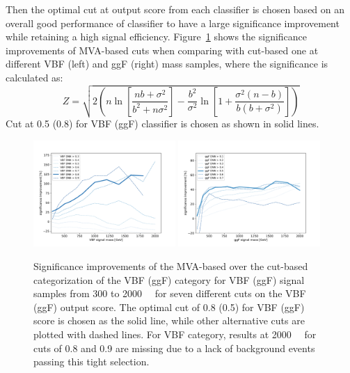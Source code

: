 Then the optimal cut at output score from each classifier is chosen based on an overall good performance of classifier to have a large significance improvement while retaining a high signal efficiency.
Figure~\ref{fig:dnn_significance} shows the significance improvements of MVA-based cuts when comparing with cut-based one at different VBF (left) and ggF (right) mass samples,
where the significance is calculated as:
\begin{equation}
Z = \sqrt{2\left(n\ln \left[ \frac{nb+\sigma^2}{b^2+n\sigma^2}\right]
        - \frac{b^2}{\sigma^2}\ln\left[1+\frac{\sigma^2(n-b)}{b(b+\sigma^2)}\right]\right)}
\end{equation}
Cut at 0.5 (0.8) for VBF (ggF) classifier is chosen as shown in solid lines.

\begin{figure}[htbp]
        \includegraphics[width=0.48\textwidth]{figures/HMHZZ/selection/VBF_significance_improvement.pdf}
        \includegraphics[width=0.48\textwidth]{figures/HMHZZ/selection/ggf_significance_improvement.pdf}
        \centering
        \caption{Significance improvements of the MVA-based over the cut-based categorization of the VBF (ggF) category for VBF (ggF) signal samples from 300 to 2000~\gev~ for seven different cuts on the VBF (ggF) output score. 
	The optimal cut of 0.8 (0.5) for VBF (ggF) score is chosen as the solid line, while other alternative cuts are plotted with dashed lines. 
	For VBF category, results at 2000~\gev~ for cuts of 0.8 and 0.9 are missing due to a lack of background events passing this tight selection.}
        \label{fig:dnn_significance}
\end{figure}

